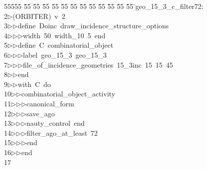 %
%
\begin{tabbing}
55555 \= 55 \= 55 \= 55 \= 55 \= 55 \= 55 \= 55 \= 55 \= 55 \= 55 \= 55 \= 55 \= \>geo\_15\_3\_c\_filter72:\\[0pt]
2\>$\triangleright$\>(ORBITER)\ v\ 2\ \\[0pt]
3\>$\triangleright$\>$\triangleright$\>define\ Doinc\ draw\_incidence\_structure\_options\ \\[0pt]
4\>$\triangleright$\>$\triangleright$\>$\triangleright$\>width\ 50\ width\_10\ 5\ end\ \\[0pt]
5\>$\triangleright$\>$\triangleright$\>define\ C\ combinatorial\_object\ \\[0pt]
6\>$\triangleright$\>$\triangleright$\>$\triangleright$\>label\ geo\_15\_3\ geo\_15\_3\ \\[0pt]
7\>$\triangleright$\>$\triangleright$\>$\triangleright$\>file\_of\_incidence\_geometries\ 15\_3inc\ 15\ 15\ 45\ \\[0pt]
8\>$\triangleright$\>$\triangleright$\>end\ \\[0pt]
9\>$\triangleright$\>$\triangleright$\>with\ C\ do\ \\[0pt]
10\>$\triangleright$\>$\triangleright$\>combinatorial\_object\_activity\ \\[0pt]
11\>$\triangleright$\>$\triangleright$\>$\triangleright$\>canonical\_form\ \\[0pt]
12\>$\triangleright$\>$\triangleright$\>$\triangleright$\>save\_ago\ \\[0pt]
13\>$\triangleright$\>$\triangleright$\>$\triangleright$\>nauty\_control\ end\ \\[0pt]
14\>$\triangleright$\>$\triangleright$\>$\triangleright$\>filter\_ago\_at\_least\ 72\ \\[0pt]
15\>$\triangleright$\>$\triangleright$\>$\triangleright$\>end\ \\[0pt]
16\>$\triangleright$\>$\triangleright$\>end\ \\[0pt]
17\>\end{tabbing}
